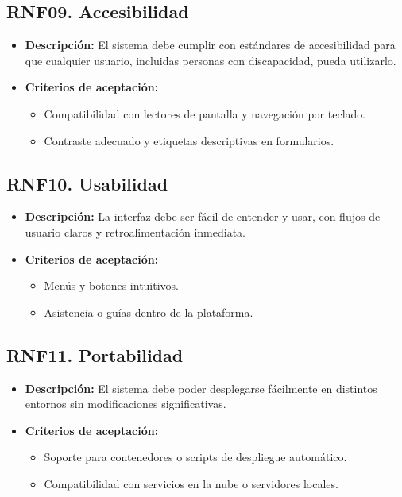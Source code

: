 	\subsection*{RNF09. Accesibilidad}
		\begin{itemize}
			\item \textbf{Descripción:} El sistema debe cumplir con estándares de accesibilidad para que cualquier usuario, incluidas personas con discapacidad, pueda utilizarlo.
			\item \textbf{Criterios de aceptación:}
			\begin{itemize}
				\item Compatibilidad con lectores de pantalla y navegación por teclado.
				\item Contraste adecuado y etiquetas descriptivas en formularios.
			\end{itemize}
		\end{itemize}
	
	\subsection*{RNF10. Usabilidad}
		\begin{itemize}
			\item \textbf{Descripción:} La interfaz debe ser fácil de entender y usar, con flujos de usuario claros y retroalimentación inmediata.
			\item \textbf{Criterios de aceptación:}
			\begin{itemize}
				\item Menús y botones intuitivos.
				\item Asistencia o guías dentro de la plataforma.
			\end{itemize}
		\end{itemize}
	
	\subsection*{RNF11. Portabilidad}
		\begin{itemize}
			\item \textbf{Descripción:} El sistema debe poder desplegarse fácilmente en distintos entornos sin modificaciones significativas.
			\item \textbf{Criterios de aceptación:}
			\begin{itemize}
				\item Soporte para contenedores o scripts de despliegue automático.
				\item Compatibilidad con servicios en la nube o servidores locales.
			\end{itemize}
		\end{itemize}
	
